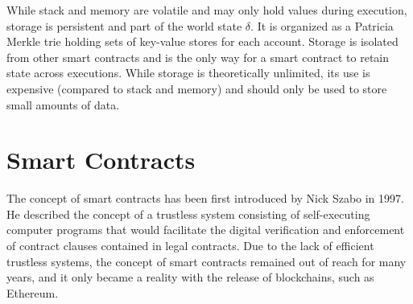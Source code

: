         While stack and memory are volatile and may only hold values during execution, storage is persistent and part of the world state $\delta$.
        It is organized as a Patricia Merkle trie holding sets of key-value stores for each account.
        Storage is isolated from other smart contracts and is the only way for a smart contract to retain state across executions.
        While storage is theoretically unlimited, its use is expensive (compared to stack and memory) and should only be used to store small amounts of data.

\section{Smart Contracts}
    The concept of smart contracts has been first introduced by Nick Szabo in 1997. He described the concept of a trustless system consisting of self-executing computer programs that would facilitate the digital verification and enforcement of contract clauses contained in legal contracts. Due to the lack of efficient trustless systems, the concept of smart contracts remained out of reach for many years, and it only became a reality with the release of blockchains, such as Ethereum.

